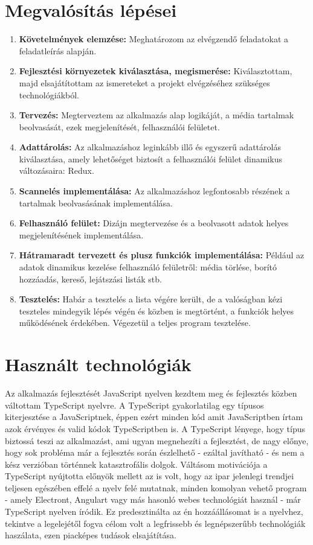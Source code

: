 \section{Megvalósítás lépései}
\begin{enumerate}
    \item {\textbf {Követelmények elemzése: }} Meghatározom az elvégzendő feladatokat a feladatleírás alapján.
    \item {\textbf {Fejlesztési környezetek kiválasztása, megismerése: }} Kiválasztottam, majd elsajátítottam az ismereteket a projekt elvégzéséhez szükséges technológiákból.
    \item {\textbf {Tervezés: }} Megterveztem az alkalmazás alap logikáját, a média tartalmak beolvasását, ezek megjelenítését, felhasználói felületet.
    \item {\textbf {Adattárolás: }} Az alkalmazáshoz leginkább illő és egyszerű adattárolás kiválasztása, amely lehetőséget biztosít a felhasználói felület dinamikus változásaira: Redux.
    \item {\textbf {Scannelés implementálása: }} Az alkalmazáshoz legfontosabb részének a tartalmak beolvasásának implementálása.
    \item {\textbf {Felhasználó felület: }} Dizájn megtervezése és a beolvasott adatok helyes megjelenítésének implementálása.
    \item {\textbf {Hátramaradt tervezett és plusz funkciók implementálása: }} Például az adatok dinamikus kezelése felhasználó felületről: média törlése, borító hozzáadás, kereső, lejátszási listák stb.
    \item {\textbf {Tesztelés: }} Habár a tesztelés a lista végére került, de a valóságban kézi teszteles mindegyik lépés végén és közben is megtörtént, a funkciók helyes működésének érdekében. Végezetül a teljes program tesztelése.
\end{enumerate}

\section{Használt technológiák}
Az alkalmazás fejlesztését JavaScript nyelven kezdtem meg és fejlesztés közben váltottam TypeScript nyelvre. A TypeScript gyakorlatilag egy típusos kiterjesztése a JavaScriptnek, éppen ezért minden kód amit JavaScriptben írtam azok érvényes és valid kódok TypeScriptben is. A TypeScript lényege, hogy típus biztossá teszi az alkalmazást, ami ugyan megnehezíti a fejlesztést, de nagy előnye, hogy sok probléma már a fejlesztés során észlelhető - ezáltal javítható - és nem a kész verzióban történnek katasztrofális dolgok. Váltásom motivációja a TypeScript nyújtotta előnyök mellett az is volt, hogy az ipar jelenlegi trendjei teljesen egészében effelé a nyelv felé mutatnak, minden komolyan vehető program - amely Electront, Angulart vagy más hasonló webes technológiát használ - már TypeScript nyelven íródik. Ez predesztinálta az én hozzáállásomat is a nyelvhez, tekintve a legelejétől fogva célom volt a legfrissebb és legnépszerűbb technológiák haszálata, ezen piacképes tudások elsajátítása.

